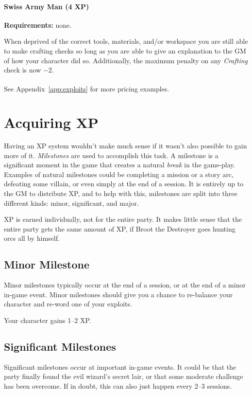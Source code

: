 \paragraph{Swiss Army Man (4 XP)}
\textbf{Requirements:} none.

When deprived of the correct tools, materials, and/or workspace you are still able to make crafting checks so long as you are able to give an explanation to the GM of how your character did so.
Additionally, the maximum penalty on any \textit{Crafting} check is now $-2$.
\\\\See Appendix~\ref{app:exploits} for more pricing examples.

\section{Acquiring XP}
Having an XP system wouldn't make much sense if it wasn't also possible to gain more of it.
\textit{Milestones} are used to accomplish this task.
A milestone is a significant moment in the game that creates a natural \textit{break} in the game-play.
Examples of natural milestones could be completing a mission or a story arc, defeating some villain, or even simply at the end of a session.
It is entirely up to the GM to distribute XP, and to help with this, milestones are split into three different kinds: minor, significant, and major.

\begin{note} 
  XP is earned individually, not for the entire party.
  It makes little sense that the entire party gets the same amount of XP, if Broot the Destroyer goes hunting orcs all by himself.
\end{note}

\subsection{Minor Milestone}
Minor milestones typically occur at the end of a session, or at the end of a minor in-game event.
Minor milestones should give you a chance to re-balance your character and re-word one of your exploits.

Your character gains 1--2 XP.

\subsection{Significant Milestones}
Significant milestones occur at important in-game events.
It could be that the party finally found the evil wizard's secret lair, or that some moderate challenge has been overcome.
If in doubt, this can also just happen every 2--3 sessions.

